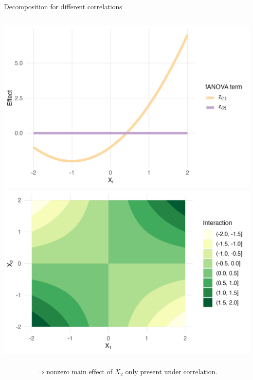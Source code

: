 \begin{frame}{Decomposition for different correlations}
  \begin{columns}
      \includegraphics[width=\linewidth]{../images/experiment_section/full_a1p20_a2p00_a11p10_a22p00_a12p05_rhop00_main.png}
      \includegraphics[width=\linewidth]{../images/experiment_section/full_a1p20_a2p00_a11p10_a22p00_a12p05_rhop00_interaction.png}
  \end{columns}
  \[
  \Rightarrow \text{nonzero main effect of } X_2 \text{ only present under correlation.}
  \]
\end{frame}





